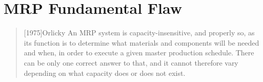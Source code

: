 %
\section{MRP Fundamental Flaw}

\begin{quote}[1975]{Orlicky}
    An MRP system is capacity-insensitive, and properly so, as its function is to determine what materials and components will be needed and when, in order to execute a given master production schedule. There can be only one correct answer to that, and it cannot therefore vary depending on what capacity does or does not exist.
\end{quote}